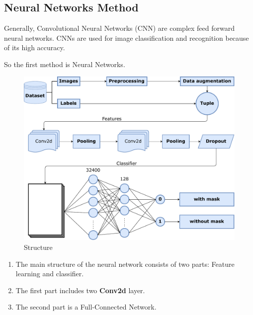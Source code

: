 \documentclass{article}
\begin{document}
  \subsection{Neural Networks Method}
  Generally, Convolutional Neural Networks (CNN) are complex feed forward neural networks. CNNs are used for image classification and recognition because of its high accuracy.

  So the first method is Neural Networks.

  \begin{figure}[!htbp]
    \centering
    \includegraphics[width=12cm]{NN.pdf}
    \caption{Structure}
  \end{figure}
  \begin{enumerate}
    \item The main structure of the neural network consists of two parts: Feature learning and classifier.
    \item The first part includes two \textbf{Conv2d} layer.
    \item The second part is a Full-Connected Network.
  \end{enumerate}
  
\end{document}
